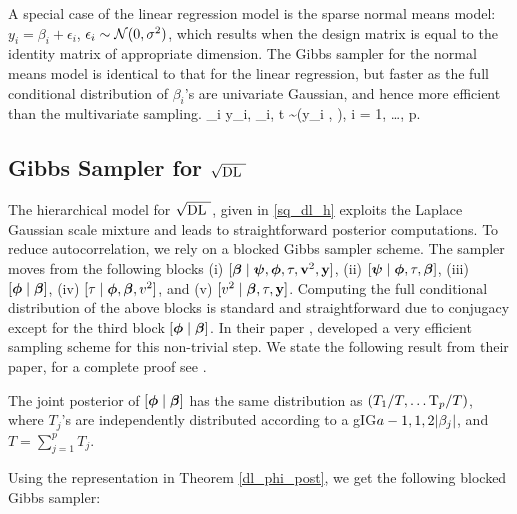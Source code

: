 \documentclass[10pt]{article}
\def\sqdl{$\sqrt{\text{\rm{DL} }}$}
\begin{document}
A special case of the linear regression model is the sparse normal means model: $y_i = \beta_i + \epsilon_i$, $\epsilon_i \sim \mathcal{N}(0,\sigma^2)$, which results when the design matrix is equal to the identity matrix of appropriate dimension. The Gibbs sampler for the normal means model is identical to that for the linear regression, but faster as the full conditional distribution of $\beta_i$'s are univariate Gaussian, and hence more efficient than the multivariate sampling. 
\beq \label{BSQ_NM}
\beta_i \mid y_i, \lambda_i, t \sim \NormRV \left(y_i ,  \right), i = 1, \ldots, p.
\eeq

\subsection{Gibbs Sampler for \sqdl{}}\label{subsec:comp-dl}

The hierarchical model for \sqdl{}, given in \eqref{sq_dl_h} exploits the Laplace Gaussian scale mixture and leads to straightforward posterior computations. To reduce autocorrelation, we rely on a blocked Gibbs sampler scheme. The sampler moves from the following blocks \rm{(i)} $ [ \boldsymbol{\beta} \mid \boldsymbol{\psi} , \boldsymbol{\phi} , \tau , {\bf v}^2 , {\bf y} ] $, \rm{(ii)} $[\boldsymbol{\psi} \mid \boldsymbol{\phi} , \tau , \boldsymbol{\beta}]$, \rm{(iii)}   $[ \boldsymbol{\phi} \mid \boldsymbol{\beta}]$, \rm{(iv)} $[ \tau \mid \boldsymbol{\phi}, \boldsymbol{\beta}, v^2 ]$, and \rm{(v)} $[ v^2 \mid \boldsymbol{\beta} ,\tau , {\bf y} ]  $. Computing the full conditional distribution of the above blocks is standard and straightforward due to conjugacy except for the third block $[ \boldsymbol{\phi} \mid \boldsymbol{\beta}]$. In their paper \citet{bhattacharya2014dirichlet}, developed a very efficient sampling scheme for this non-trivial step. We state the following result from their paper, for a complete proof see \citep{bhattacharya2014dirichlet}.


\begin{theorem}\label{dl_phi_post}
The joint posterior of $[\boldsymbol{\phi} \mid \boldsymbol{\beta} ]$ has the same distribution as $ \left( T_1/T, \ldots {\rm T}_p/T \right)$, where $T_j$'s are independently distributed according to a \rm{gIG}$a-1 , 1 , 2\lvert\beta_j\rvert$, and $T = \sum_{j=1}^{p}T_j$. 
\end{theorem}



Using the representation in Theorem \ref{dl_phi_post}, we get the following blocked Gibbs sampler:
\end{document}
